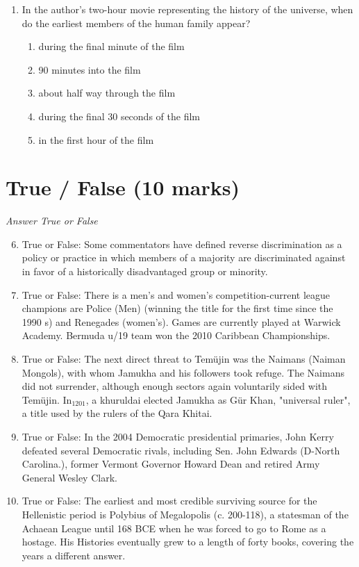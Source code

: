 \documentclass[12pt]{article}
\begin{document}
\begin{enumerate}[label=\arabic*.]
\begin{enumerate}[label=(\alph*)]
    \item coins recovered from ancient shipwrecks.
    \item dendrochronology.
    \item all of the above.
    \item ice core sampling.
    \item written records.
\end{enumerate}
\item In the author's two-hour movie representing the history of the universe, when do the earliest members of the human family appear?
\begin{enumerate}[label=(\alph*)]
    \item during the final minute of the film
    \item 90 minutes into the film
    \item about half way through the film
    \item during the final 30 seconds of the film
    \item in the first hour of the film
\end{enumerate}
\end{enumerate}

\section*{True / False (10 marks)}
\textit{Answer True or False}
\begin{enumerate}[label=\arabic*.]
\setcounter{enumi}{5}
\item True or False: Some commentators have defined reverse discrimination as a policy or practice in which members of a majority are discriminated against in favor of a historically disadvantaged group or minority.
\item True or False: There is a men's and women's competition-current league champions are Police (Men) (winning the title for the first time since the 1990 s) and Renegades (women's). Games are currently played at Warwick Academy. Bermuda u/19 team won the 2010 Caribbean Championships.
\item True or False: The next direct threat to Temüjin was the Naimans (Naiman Mongols), with whom Jamukha and his followers took refuge. The Naimans did not surrender, although enough sectors again voluntarily sided with Temüjin. In$_{1201}$, a khuruldai elected Jamukha as Gür Khan, "universal ruler", a title used by the rulers of the Qara Khitai.
\item True or False: In the 2004 Democratic presidential primaries, John Kerry defeated several Democratic rivals, including Sen. John Edwards (D-North Carolina.), former Vermont Governor Howard Dean and retired Army General Wesley Clark.
\item True or False: The earliest and most credible surviving source for the Hellenistic period is Polybius of Megalopolis (c. 200-118), a statesman of the Achaean League until 168 BCE when he was forced to go to Rome as a hostage. His Histories eventually grew to a length of forty books, covering the years a different answer.
\end{enumerate}
\end{document}
